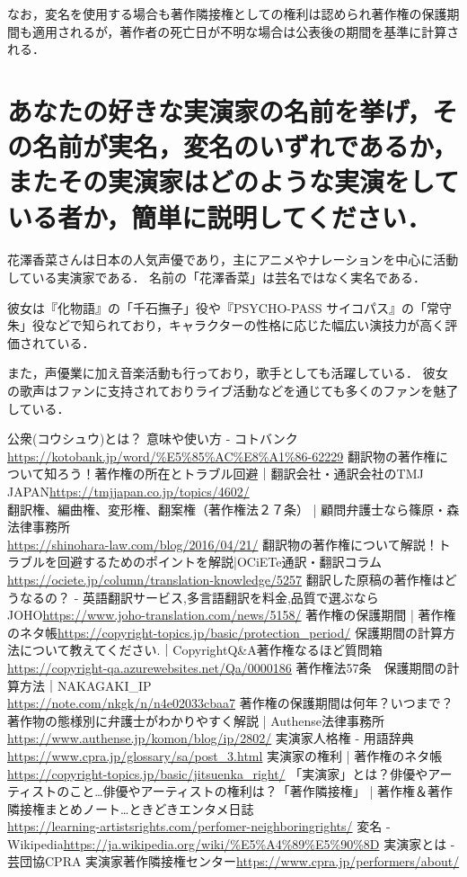 \documentclass[titlepage,a4paper]{jsarticle}
\begin{document}
なお，変名を使用する場合も著作隣接権としての権利は認められ著作権の保護期間も適用されるが，著作者の死亡日が不明な場合は公表後の期間を基準に計算される\cite{q4_2}．
\section{あなたの好きな実演家の名前を挙げ，その名前が実名，変名のいずれであるか，
  またその実演家はどのような実演をしている者か，簡単に説明してください．}
花澤香菜さんは日本の人気声優であり，主にアニメやナレーションを中心に活動している実演家である．
名前の「花澤香菜」は芸名ではなく実名である．

彼女は『化物語』の「千石撫子」役や『PSYCHO-PASS サイコパス』の「常守朱」役などで知られており，キャラクターの性格に応じた幅広い演技力が高く評価されている．

また，声優業に加え音楽活動も行っており，歌手としても活躍している．
彼女の歌声はファンに支持されておりライブ活動などを通じても多くのファンを魅了している．

\begin{thebibliography}{99}
   公衆(コウシュウ)とは？ 意味や使い方 - コトバンク\url{https://kotobank.jp/word/%E5%85%AC%E8%A1%86-62229}
   翻訳物の著作権について知ろう！著作権の所在とトラブル回避｜翻訳会社・通訳会社のTMJ JAPAN\url{https://tmjjapan.co.jp/topics/4602/}\\
   翻訳権、編曲権、変形権、翻案権（著作権法２７条） | 顧問弁護士なら篠原・森法律事務所
  \\\url{https://shinohara-law.com/blog/2016/04/21/}
   翻訳物の著作権について解説！トラブルを回避するためのポイントを解説|OCiETe通訳・翻訳コラム\url{https://ociete.jp/column/translation-knowledge/5257}
   翻訳した原稿の著作権はどうなるの？ - 英語翻訳サービス,多言語翻訳を料金,品質で選ぶならJOHO\url{https://www.joho-translation.com/news/5158/}
   著作権の保護期間 | 著作権のネタ帳\url{https://copyright-topics.jp/basic/protection_period/}
   保護期間の計算方法について教えてください.｜CopyrightQ\&A著作権なるほど質問箱\url{https://copyright-qa.azurewebsites.net/Qa/0000186}
   著作権法57条　保護期間の計算方法｜NAKAGAKI\_IP
  \\\url{https://note.com/nkgk/n/n4e02033cbaa7}
   著作権の保護期間は何年？いつまで？著作物の態様別に弁護士がわかりやすく解説 | Authense法律事務所\url{https://www.authense.jp/komon/blog/ip/2802/}
   実演家人格権 - 用語辞典\url{https://www.cpra.jp/glossary/sa/post_3.html}
   実演家の権利 | 著作権のネタ帳\url{https://copyright-topics.jp/basic/jitsuenka_right/}
   「実演家」とは？俳優やアーティストのこと…俳優やアーティストの権利は？「著作隣接権」 | 著作権＆著作隣接権まとめノート…ときどきエンタメ日誌
  \\\url{https://learning-artistsrights.com/perfomer-neighboringrights/}
   変名 - Wikipedia\url{https://ja.wikipedia.org/wiki/%E5%A4%89%E5%90%8D}
   実演家とは - 芸団協CPRA 実演家著作隣接権センター\url{https://www.cpra.jp/performers/about/}
\end{thebibliography}
\end{document}
